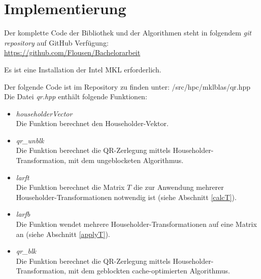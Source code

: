 \section{Implementierung}
Der komplette Code der Bibliothek und der Algorithmen steht in folgendem \textit{git repository} auf GitHub Verfügung: \\
\url{https://github.com/Flousen/Bachelorarbeit} 

Es ist eine Installation der Intel MKL erforderlich.

Der folgende Code ist im Repository zu finden unter: /src/hpc/mklblas/qr.hpp\\
Die Datei \textit{qr.hpp} enthält folgende Funktionen:
\begin{itemize}
    \item \textit{householderVector}\\
    Die Funktion berechnet den Householder-Vektor.
	\item \textit{qr\_unblk} \\
	Die Funktion berechnet die QR-Zerlegung mittels Householder-Transformation, mit dem ungeblocketen Algorithmus.
	\item \textit{larft}\\
	Die Funktion berechnet die Matrix $T$ die zur Anwendung mehrerer Householder-Transformationen notwendig ist (siehe Abschnitt \ref{calcT}).
	\item \textit{larfb}\\
	Die Funktion wendet mehrere Householder-Transformationen auf eine Matrix an (siehe Abschnitt \ref{applyT}). 
	\item \textit{qr\_blk}\\
	Die Funktion berechnet die QR-Zerlegung mittels Householder-Transformation, mit dem geblockten cache-optimierten Algorithmus.
\end{itemize}

\vspace{.7cm}
\lstset{numbers=left,firstnumber=1}



